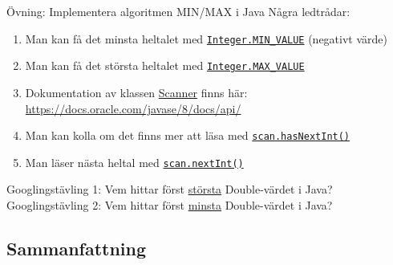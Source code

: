 \documentclass{lecturenotes}
\begin{document}
\begin{Slide}{Övning: Implementera algoritmen MIN/MAX i Java}
\footnotesize
Några ledtrådar:
\begin{enumerate}
\item Man kan få det minsta heltalet med \href{https://docs.oracle.com/javase/8/docs/api/java/lang/Integer.html}{\lstinline{Integer.MIN_VALUE}} (negativt värde)
\item Man kan få det största heltalet med \href{https://docs.oracle.com/javase/8/docs/api/java/lang/Integer.html}{\lstinline{Integer.MAX_VALUE}}
\item Dokumentation av klassen \href{https://docs.oracle.com/javase/8/docs/api/java/util/Scanner.html}{Scanner} finns här: \url{https://docs.oracle.com/javase/8/docs/api/}
\item Man kan kolla om det finns mer att läsa med \href{https://docs.oracle.com/javase/8/docs/api/java/util/Scanner.html#hasNextInt--}{\lstinline{scan.hasNextInt()}}
\item Man läser nästa heltal med  \href{http://docs.oracle.com/javase/8/docs/api/java/util/Scanner.html#nextInt%28%29}{\lstinline{scan.nextInt()}}
\end{enumerate}
\vspace{2em}
\scriptsize Googlingstävling 1: Vem hittar först \underline{största} Double-värdet i Java? \\ Googlingstävling 2: Vem hittar först \underline{minsta} Double-värdet i Java?
\end{Slide}
	
\subsection{Sammanfattning}
\end{document}
